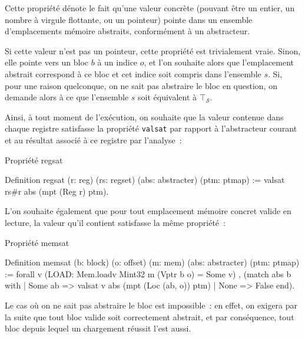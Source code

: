 \documentclass{article}
\newcommand\tS{\mathcal{S}}
\begin{document}
Cette propriété dénote le fait qu'une valeur concrète (pouvant être un entier,
un nombre à virgule flottante, ou un pointeur) pointe dans un ensemble
d'emplacements mémoire abstraits, conformément à un abstracteur.

Si cette valeur n'est pas un pointeur, cette propriété est trivialement vraie.
Sinon, elle pointe vers un bloc $b$ à un indice $o$, et l'on souhaite alors que
l'emplacement abstrait correspond à ce bloc et cet indice soit compris dans
l'ensemble $s$. Si, pour une raison quelconque, on ne sait pas abstraire le
bloc en question, on demande alors à ce que l'ensemble $s$ soit équivalent à
$\top_\tS$.

Ainsi, à tout moment de l'exécution, on souhaite que la valeur contenue dans
chaque registre satisfasse la propriété \texttt{valsat} par rapport à
l'abstracteur courant et au résultat associé à ce registre par l'analyse~:

\begin{coqcode}
\caption{Propriété regsat}
\begin{english}
\begin{coq}
Definition regsat (r: reg) (rs: regset) (abs: abstracter) (ptm: ptmap) :=
valsat rs#r abs (mpt (Reg r) ptm).
\end{coq}
\end{english}
\end{coqcode}

L'on souhaite également que pour tout emplacement mémoire concret valide en
lecture, la valeur qu'il contient satisfasse la même propriété~:

\begin{coqcode}
\caption{Propriété memsat}
\begin{english}
\begin{coq}
Definition memsat (b: block) (o: offset) (m: mem) (abs: abstracter) (ptm: ptmap) :=
forall v
  (LOAD: Mem.loadv Mint32 m (Vptr b o) = Some v)
  ,
  (match abs b with
    | Some ab => valsat v abs (mpt (Loc (ab, o)) ptm)
    | None    => False
    end).
\end{coq}
\end{english}
\end{coqcode}

Le cas où on ne sait pas abstraire le bloc est impossible~: en effet, on
exigera par la suite que tout bloc valide soit correctement abstrait, et par
conséquence, tout bloc depuis lequel un chargement réussit l'est aussi.
\end{document}
